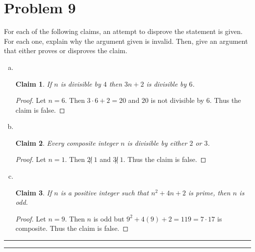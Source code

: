 \documentclass{article}
\newtheorem*{claim}{Claim} %
\theoremstyle{definition}
\newenvironment{solution}{\bigskip\hrule{\hfill}}{\bigskip\hrule{\hfill}} %
\begin{document}

\newpage


\section*{Problem 9}

For each of the following claims, an attempt to disprove the statement is given. For each one, explain why the argument given is invalid. Then, give an argument that either proves or disproves the claim.

\begin{enumerate}[a)] %
    \item ~\vspace{-19pt}
    \begin{claim}
        If $n$ is divisible by $4$ then $3n+2$ is divisible by $6$.
    \end{claim}
    \begin{proof}
        Let $n=6$. Then $3\cdot 6+2=20$ and $20$ is not divisible by $6$. Thus the claim is false.
    \end{proof}
    
    \item ~\vspace{-19pt}
    \begin{claim}
         Every composite integer $n$ is divisible by either $2$ or $3$.
    \end{claim}
    \begin{proof}
        Let $n=1$. Then $2\not|~ 1$ and $3\not|~1$. Thus the claim is false.
    \end{proof}

    \item ~\vspace{-19pt}
    \begin{claim}
        If $n$ is a positive integer such that $n^2+4n+2$ is prime, then $n$ is odd.
    \end{claim}
    \begin{proof}
        Let $n=9$. Then $n$ is odd but $9^2+4\left(9\right)+2=119=7\cdot17$ is composite. Thus the claim is false.
    \end{proof}
\end{enumerate}

\begin{solution}


\end{solution}

\end{document}
